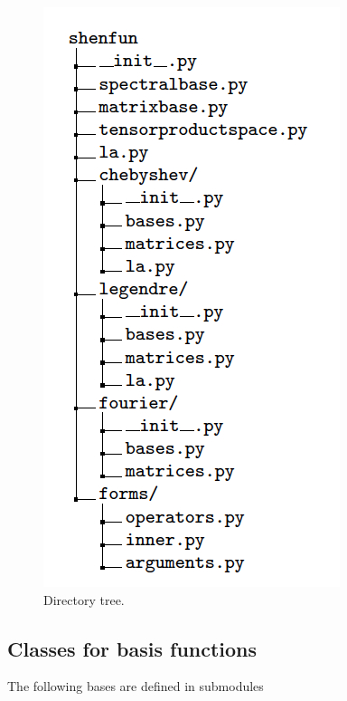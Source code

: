 \documentclass[%
oneside,                 %
final,                   %
10pt]{article}
\begin{document}
\begin{figure}[!ht]  %
  \centerline{\includegraphics[width=0.5\linewidth]{figs/dirtree.png}}
  \caption{
  Directory tree. \label{fig:directorytree}
  }
\end{figure}


\subsection{Classes for basis functions}

The following bases are defined in submodules
\end{document}
